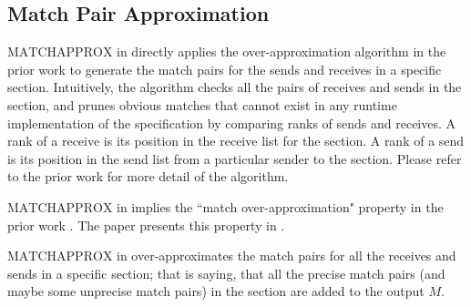 \subsection{Match Pair Approximation}

$\mathrm{MATCHAPPROX}$ in  directly applies the over-approximation algorithm in the prior work \cite{DBLP:conf/kbse/HuangMM13} to generate the match pairs for the sends and receives in a specific section.
Intuitively, the algorithm checks all the pairs of receives and sends in the section, and prunes obvious matches that cannot exist in any runtime implementation of the specification by comparing ranks of sends and receives. 
A rank of a receive is its position in the receive list for the section. 
A rank of a send is its position in the send list from a particular sender to the section.    
Please refer to the prior work \cite{DBLP:conf/kbse/HuangMM13} for more detail of the algorithm. 


$\mathrm{MATCHAPPROX}$ in  implies the ``match over-approximation" property in the prior work \cite{DBLP:conf/kbse/HuangMM13}. The paper presents this property in . 

\begin{lemma}
$\mathrm{MATCHAPPROX}$ in  over-approximates the match pairs for all the receives and sends in a specific section; that is saying, that all the precise match pairs (and maybe some unprecise match pairs) in the section are added to the output $M$.
\label{lemma:match}
\end{lemma}



